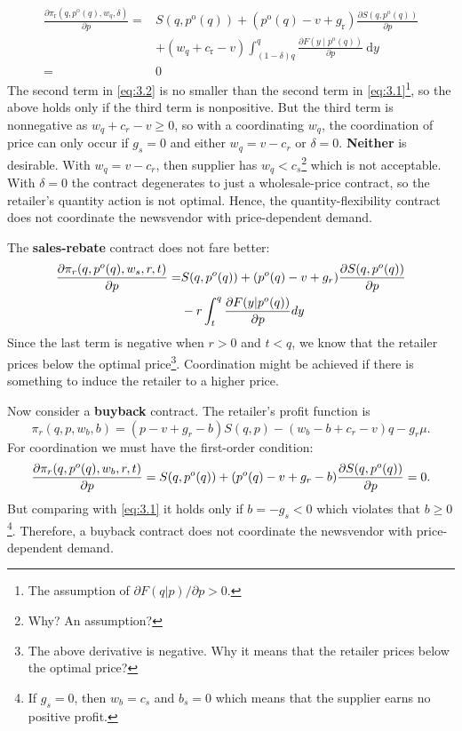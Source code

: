\begin{align}
\frac{\partial \pi_{\mathrm{r}}\left(q, p^{\mathrm{o}}(q), w_{q}, \delta\right)}{\partial p}=& S\left(q, p^{\mathrm{o}}(q)\right)+\left(p^{\mathrm{o}}(q)-v+g_{\mathrm{r}}\right) \frac{\partial S\left(q, p^{\mathrm{o}}(q)\right)}{\partial p} \nonumber\\
&+\left(w_{q}+c_{\mathrm{r}}-v\right) \int_{(1-\delta) q}^{q} \frac{\partial F\left(y \mid p^{\mathrm{o}}(q)\right)}{\partial p} \mathrm{~d} y \nonumber\\
=& 0\label{eq:3.2}
\end{align}
The second term in \autoref{eq:3.2} is no smaller than the second term in \autoref{eq:3.1}\footnote{The assumption of $\partial F(q|p)/\partial p>0.$}, so the above holds only if the third term is nonpositive. 
But the third term is nonnegative as $w_q+c_r-v\geq 0$, so with a coordinating $w_q$, the coordination of price can only occur if $g_s=0$ and either $w_q=v-c_r$ or $\delta=0$. \textbf{Neither} is desirable. With $w_q=v-c_r$, then supplier has $w_q<c_s$\footnote{Why? An assumption?} which is not acceptable. With $\delta=0$ the contract degenerates to just a wholesale-price contract, so the retailer's quantity action is not optimal. Hence, the quantity-flexibility contract does not coordinate the newsvendor with price-dependent demand.

The \textbf{sales-rebate} contract does not fare better:
\begin{align*}
    \frac{\partial\pi_r(q,p^o(q),w_s,r,t)}{\partial p}=&S(q,p^o(q))+(p^o(q)-v+g_r)\frac{\partial S(q,p^o(q))}{\partial p}\\
    &-r\int_t^q\frac{\partial F(y|p^o(q))}{\partial p}dy
\end{align*}
Since the last term is negative when $r>0$ and $t<q$, we know that the retailer prices below the optimal price\footnote{The above derivative is negative. Why it means that the retailer prices below the optimal price?}. Coordination might be achieved if there is something to induce the retailer to a higher price.

Now consider a \textbf{buyback} contract. The retailer's profit function is 
\begin{equation*}
    \pi_r(q,p,w_b,b)=(p-v+g_r-b)S(q,p)-(w_b-b+c_r-v)q-g_r\mu.
\end{equation*}
For coordination we must have the first-order condition:
\begin{equation}\label{eq:3.3}
    \frac{\partial\pi_r(q,p^o(q),w_b,r,t)}{\partial p}=S(q,p^o(q))+(p^o(q)-v+g_r-b)\frac{\partial S(q,p^o(q))}{\partial p}=0.
\end{equation}
But comparing with \autoref{eq:3.1} it holds only if $b=-g_s< 0$ which violates that $b\geq 0$\footnote{If $g_s=0$, then $w_b=c_s$ and $b_s=0$ which means that the supplier earns no positive profit.}. Therefore, a buyback contract does not coordinate the newsvendor with price-dependent demand.

